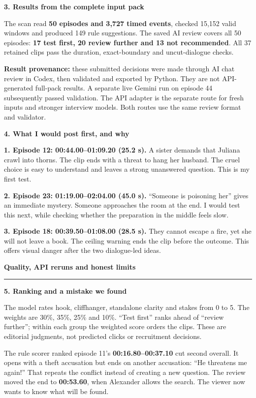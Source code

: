 \documentclass[10pt,a4paper]{article}
\newcommand{\heading}[1]{\vspace{4pt}\textbf{\large #1}\par\vspace{-2pt}}
\begin{document}
\heading{3. Results from the complete input pack}
The scan read \textbf{50 episodes and 3,727 timed events}, checked 15,152 valid windows and produced 149 rule suggestions. The saved AI review covers all 50 episodes: \textbf{17 test first, 20 review further and 13 not recommended}. All 37 retained clips pass the duration, exact-boundary and uncut-dialogue checks.

\textbf{Result provenance:} these submitted decisions were made through AI chat review in Codex, then validated and exported by Python. They are not API-generated full-pack results. A separate live Gemini run on episode 44 subsequently passed validation. The API adapter is the separate route for fresh inputs and stronger interview models. Both routes use the same review format and validator.

\heading{4. What I would post first, and why}
\textbf{1. Episode 12: 00:44.00--01:09.20 (25.2 s).} A sister demands that Juliana crawl into thorns. The clip ends with a threat to hang her husband. The cruel choice is easy to understand and leaves a strong unanswered question. This is my first test.

\textbf{2. Episode 23: 01:19.00--02:04.00 (45.0 s).} ``Someone is poisoning her'' gives an immediate mystery. Someone approaches the room at the end. I would test this next, while checking whether the preparation in the middle feels slow.

\textbf{3. Episode 18: 00:39.50--01:08.00 (28.5 s).} They cannot escape a fire, yet she will not leave a book. The ceiling warning ends the clip before the outcome. This offers visual danger after the two dialogue-led ideas.

\newpage
\begin{center}{\large\bfseries Quality, API reruns and honest limits}\end{center}
\vspace{-5pt}\hrule\vspace{5pt}

\heading{5. Ranking and a mistake we found}
The model rates hook, cliffhanger, standalone clarity and stakes from 0 to 5. The weights are 30\%, 35\%, 25\% and 10\%. ``Test first'' ranks ahead of ``review further''; within each group the weighted score orders the clips. These are editorial judgments, not predicted clicks or recruitment decisions.

The rule scorer ranked episode 11's \textbf{00:16.80--00:37.10} cut second overall. It opens with a theft accusation but ends on another accusation: ``He threatens me again!'' That repeats the conflict instead of creating a new question. The review moved the end to \textbf{00:53.60}, when Alexander allows the search. The viewer now wants to know what will be found.
\end{document}
